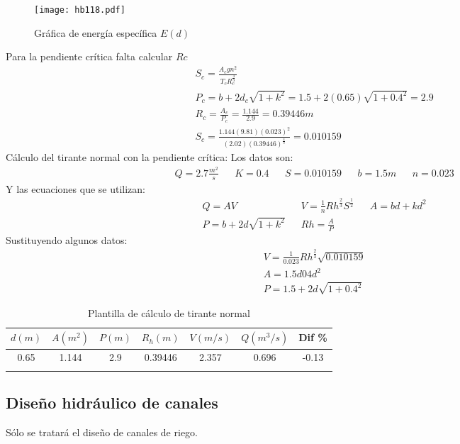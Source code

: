\begin{figure}[h!]
\centering
  \texttt{[image: hb118.pdf]}
  \caption{Gráfica de energía específica $E(d)$}
  \label{hb118}
\end{figure}
Para la pendiente crítica falta calcular $Rc$
\begin{align*}
    &S_c = \frac{A_c gn^2}{T_c R_c^{\frac{4}{3}}}\\
    &P_c = b + 2 d_c \sqrt{1 + k^2} = 1.5 + 2(0.65)\sqrt{1 + 0.4^2} = 2.9\\
    &R_c = \frac{A_c}{P_c} = \frac{1.144}{2.9} = 0.39446m\\
    &S_c = \frac{1.144(9.81)(0.023)^2}{(2.02)\left(0.39446\right)^{\frac{4}{3}}} = 0.010159
\end{align*}
Cálculo del tirante normal con la pendiente crítica:
Los datos son:
\begin{align*}
    &Q = 2.7 \frac{m^2}{s}&&K =0.4&&S = 0.010159&&b =1.5m&&n = 0.023
\end{align*}
Y las ecuaciones que se utilizan:
\begin{align*}
    &Q = AV&&V = \frac{1}{n} Rh^{\frac{2}{3}}S^{\frac{1}{2}}&&A = bd + kd^2\\
    &P = b + 2d\sqrt{1 + k^2}&&Rh = \frac{A}{P}
\end{align*}
Sustituyendo algunos datos:
\begin{align*}
    &V = \frac{1}{0.023}Rh^{\frac{2}{3}} \sqrt{0.010159}\\
    &A =1.5d 04d^2\\
    &P = 1.5 + 2d \sqrt{1 + 0.4^2}
\end{align*}
\begin{table}[h!]
    \centering
\begin{tabular}{@{}ccccccc@{}}
\toprule
$d(m)$ & $A(m^2)$ & $P(m)$ & $R_h(m)$ & $V(m/s)$ & $Q(m^3/s)$ & Dif \% \\ \midrule
0.65   & 1.144    & 2.9    & 0.39446  & 2.357    & 0.696      & -0.13  \\
       &          &        &          &          &            &        \\ \bottomrule
\end{tabular}
\caption{Plantilla de cálculo de tirante normal}
\label{tabhb37}
\end{table}
\subsection{Diseño hidráulico de canales}
Sólo se tratará el diseño de canales de riego.

